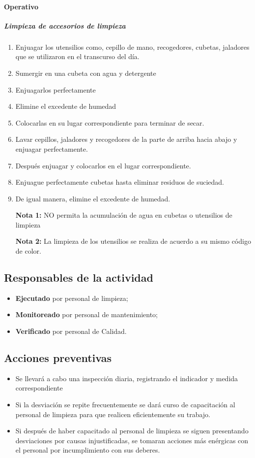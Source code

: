\paragraph{Operativo}

\subparagraph{Limpieza de accesorios de limpieza}

\begin{enumerate}
	\item Enjuagar los utensilios como, cepillo de mano, recogedores, cubetas, jaladores que se utilizaron en el transcurso del día.
	\item Sumergir en una cubeta con agua y detergente
	\item Enjuagarlos perfectamente
	\item Elimine el excedente de humedad
	\item Colocarlas en su lugar correspondiente para terminar de secar.
	\item Lavar cepillos, jaladores y recogedores de la parte de arriba hacia abajo y enjuagar perfectamente.
	\item Después enjuagar y colocarlos en el lugar correspondiente.
	\item Enjuague perfectamente cubetas hasta eliminar residuos de suciedad.
	\item De igual manera, elimine el excedente de humedad.
	\item[\textbf{Nota 1:}] NO permita la acumulación de agua en cubetas o utensilios de limpieza
	\item[\textbf{Nota 2:}] La limpieza de los utensilios se realiza de acuerdo a su mismo código de color.
\end{enumerate}

\subsection{Responsables de la actividad}
\begin{itemize}
	\item \textbf{Ejecutado} por personal de limpieza;
	\item \textbf{Monitoreado} por personal de mantenimiento;
	\item \textbf{Verificado} por personal de Calidad.
\end{itemize}

\subsection{Acciones preventivas}
\begin{itemize}
	\item Se llevará a cabo una inspección diaria, registrando el indicador y medida correspondiente
	\item Si la desviación se repite frecuentemente se dará curso de capacitación al personal de limpieza para que realicen eficientemente su trabajo.
	\item Si después de haber capacitado al personal de limpieza se siguen presentando desviaciones por causas injustificadas, se tomaran acciones más enérgicas con el personal por incumplimiento con sus deberes.
\end{itemize}

